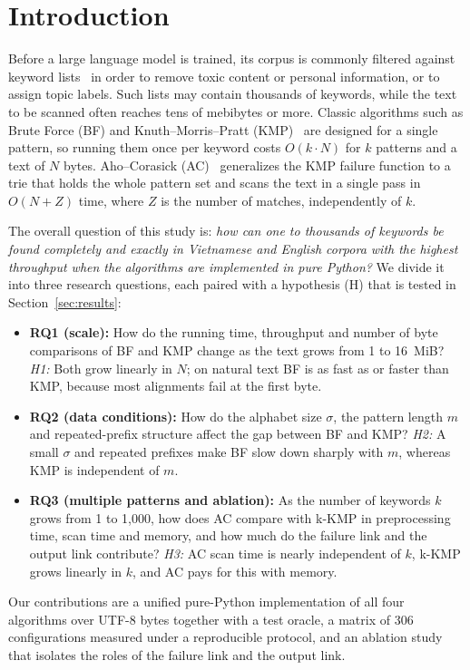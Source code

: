 \documentclass[conference]{IEEEtran}
\begin{document}
\section{Introduction}
Before a large language model is trained, its corpus is commonly filtered against keyword lists~\cite{t5} in order to remove toxic content or personal information, or to assign topic labels. Such lists may contain thousands of keywords, while the text to be scanned often reaches tens of mebibytes or more. Classic algorithms such as Brute Force (BF) and Knuth--Morris--Pratt (KMP)~\cite{kmp} are designed for a single pattern, so running them once per keyword costs $O(k\cdot N)$ for $k$ patterns and a text of $N$ bytes. Aho--Corasick (AC)~\cite{ac} generalizes the KMP failure function to a trie that holds the whole pattern set and scans the text in a single pass in $O(N+Z)$ time, where $Z$ is the number of matches, independently of $k$.

The overall question of this study is: \emph{how can one to thousands of keywords be found completely and exactly in Vietnamese and English corpora with the highest throughput when the algorithms are implemented in pure Python?} We divide it into three research questions, each paired with a hypothesis (H) that is tested in Section~\ref{sec:results}:
\begin{itemize}
\item \textbf{RQ1 (scale):} How do the running time, throughput and number of byte comparisons of BF and KMP change as the text grows from 1 to 16~MiB? \emph{H1:} Both grow linearly in $N$; on natural text BF is as fast as or faster than KMP, because most alignments fail at the first byte.
\item \textbf{RQ2 (data conditions):} How do the alphabet size $\sigma$, the pattern length $m$ and repeated-prefix structure affect the gap between BF and KMP? \emph{H2:} A small $\sigma$ and repeated prefixes make BF slow down sharply with $m$, whereas KMP is independent of $m$.
\item \textbf{RQ3 (multiple patterns and ablation):} As the number of keywords $k$ grows from 1 to 1{,}000, how does AC compare with k-KMP in preprocessing time, scan time and memory, and how much do the failure link and the output link contribute? \emph{H3:} AC scan time is nearly independent of $k$, k-KMP grows linearly in $k$, and AC pays for this with memory.
\end{itemize}
Our contributions are a unified pure-Python implementation of all four algorithms over UTF-8 bytes together with a test oracle, a matrix of 306 configurations measured under a reproducible protocol, and an ablation study that isolates the roles of the failure link and the output link.
\end{document}
